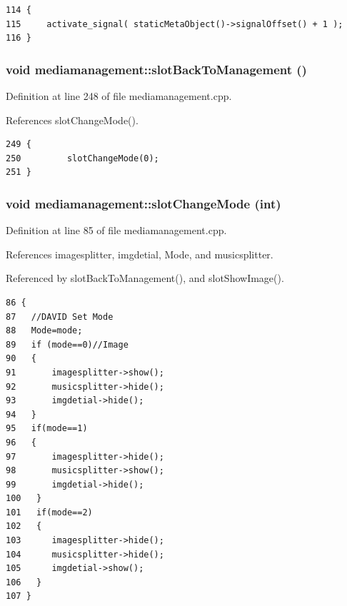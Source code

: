 \footnotesize\begin{verbatim}114 {
115     activate_signal( staticMetaObject()->signalOffset() + 1 );
116 }
\end{verbatim}\normalsize 
{}
\subsubsection{\setlength{\rightskip}{0pt plus 5cm}void mediamanagement::slot\-Back\-To\-Management ()\hspace{0.3cm}{\tt  [slot]}}\label{classmediamanagement_mediamanagementi6}




Definition at line 248 of file mediamanagement.cpp.

References slot\-Change\-Mode().



\footnotesize\begin{verbatim}249 {
250         slotChangeMode(0);
251 }
\end{verbatim}\normalsize 
{}
\subsubsection{\setlength{\rightskip}{0pt plus 5cm}void mediamanagement::slot\-Change\-Mode (int)\hspace{0.3cm}{\tt  [slot]}}\label{classmediamanagement_mediamanagementi0}




Definition at line 85 of file mediamanagement.cpp.

References imagesplitter, imgdetial, Mode, and musicsplitter.

Referenced by slot\-Back\-To\-Management(), and slot\-Show\-Image().



\footnotesize\begin{verbatim}86 {
87   //DAVID Set Mode
88   Mode=mode;
89   if (mode==0)//Image
90   {
91       imagesplitter->show();
92       musicsplitter->hide();
93       imgdetial->hide();
94   }
95   if(mode==1)
96   {
97       imagesplitter->hide();
98       musicsplitter->show();
99       imgdetial->hide();
100   }
101   if(mode==2)
102   {
103      imagesplitter->hide();
104      musicsplitter->hide();
105      imgdetial->show();
106   }
107 }
\end{verbatim}\normalsize 
{}
